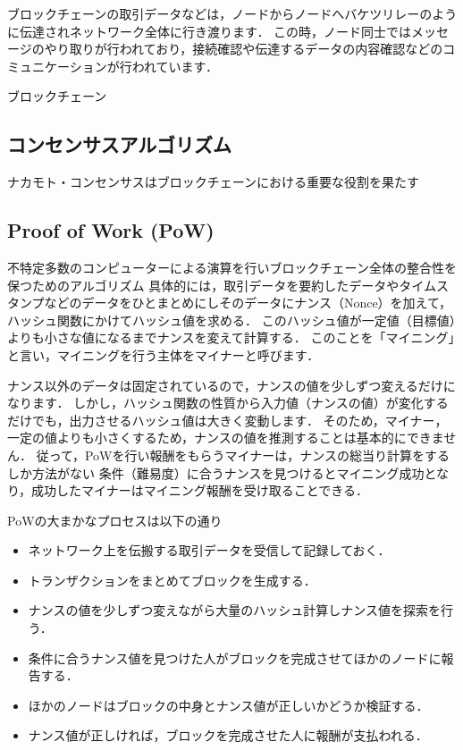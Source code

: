 \documentclass[a4paper,12pt]{jsarticle}
\begin{document}
ブロックチェーンの取引データなどは，ノードからノードへバケツリレーのように伝達されネットワーク全体に行き渡ります．
この時，ノード同士ではメッセージのやり取りが行われており，接続確認や伝達するデータの内容確認などのコミュニケーションが行われています．

ブロックチェーン

      \subsection*{コンセンサスアルゴリズム}
      
ナカモト・コンセンサスはブロックチェーンにおける重要な役割を果たす


      \subsection*{Proof of Work (PoW)}%
不特定多数のコンピューターによる演算を行いブロックチェーン全体の整合性を保つためのアルゴリズム
具体的には，取引データを要約したデータやタイムスタンプなどのデータをひとまとめにしそのデータにナンス（Nonce）を加えて，ハッシュ関数にかけてハッシュ値を求める．
このハッシュ値が一定値（目標値）よりも小さな値になるまでナンスを変えて計算する．
このことを「マイニング」と言い，マイニングを行う主体をマイナーと呼びます．


ナンス以外のデータは固定されているので，ナンスの値を少しずつ変えるだけになります．
しかし，ハッシュ関数の性質から入力値（ナンスの値）が変化するだけでも，出力させるハッシュ値は大きく変動します．
そのため，マイナー，一定の値よりも小さくするため，ナンスの値を推測することは基本的にできません．
従って，PoWを行い報酬をもらうマイナーは，ナンスの総当り計算をするしか方法がない
条件（難易度）に合うナンスを見つけるとマイニング成功となり，成功したマイナーはマイニング報酬を受け取ることできる．

PoWの大まかなプロセスは以下の通り
\begin{itemize}
  \item ネットワーク上を伝搬する取引データを受信して記録しておく．
  \item トランザクションをまとめてブロックを生成する．
  \item ナンスの値を少しずつ変えながら大量のハッシュ計算しナンス値を探索を行う．
  \item 条件に合うナンス値を見つけた人がブロックを完成させてほかのノードに報告する．
  \item ほかのノードはブロックの中身とナンス値が正しいかどうか検証する．
  \item ナンス値が正しければ，ブロックを完成させた人に報酬が支払われる．
\end{itemize}
\end{document}
